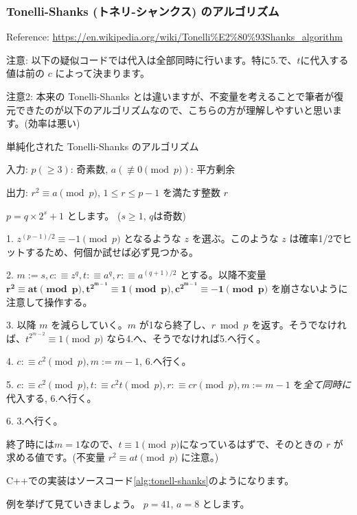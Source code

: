 \documentclass{jsarticle}
\begin{document}
   \subsubsection{Tonelli-Shanks (トネリ-シャンクス) のアルゴリズム}
Reference: \url{https://en.wikipedia.org/wiki/Tonelli%E2%80%93Shanks_algorithm}

注意: 以下の疑似コードでは代入は全部同時に行います。特に5.で、$t$に代入する値は前の $c$ によって決まります。

注意2: 本来の Tonelli-Shanks とは違いますが、不変量を考えることで筆者が復元できたのが以下のアルゴリズムなので、こちらの方が理解しやすいと思います。(効率は悪い)

\begin{algorithm}                      
\caption{単純化された Tonelli-Shanks のアルゴリズム}
\label{alg:simplified-tonelli-shanks}
入力: $p (\ge 3)$: 奇素数, $a (\not \equiv 0 \pmod p)$: 平方剰余

出力: $r^2 \equiv a \pmod p$, $1 \le r \le p - 1$ を満たす整数 $r$

$p = q \times 2^s + 1$ とします。 ($s \ge 1$, $q$は奇数)

1. $z^{(p-1)/2} \equiv -1 \pmod p$ となるような $z$ を選ぶ。このような $z$ は確率1/2でヒットするため、何個か試せば必ず見つかる。

2. $m := s, c:\equiv z^q, t :\equiv a^q, r :\equiv a^{(q + 1)/2}$ とする。以降不変量 $\bm{r^2\equiv at \pmod p, t^{2^{m - 1}} \equiv 1 \pmod p, c^{2^{m-1}} \equiv -1 \pmod p}$ を崩さないように注意して操作する。

3. 以降 $m$ を減らしていく。$m$ が1なら終了し、$r \bmod p$ を返す。そうでなければ、$t^{2^{m-2}} \equiv 1 \pmod p$ なら4.へ、そうでなければ5.へ行く。

4. $c :\equiv c^2 \pmod p, m := m - 1$, 6.へ行く。

5. $c :\equiv c^2 \pmod p, t :\equiv c^2 t \pmod p, r :\equiv cr \pmod p, m := m - 1$ を\emph{全て同時に}代入する, 6.へ行く。

6. 3.へ行く。

\end{algorithm}
終了時には$m=1$なので、$t\equiv 1 \pmod p$になっているはずで、そのときの $r$ が求める値です。(不変量 $r^2\equiv at \pmod p$ に注意。)



C++での実装はソースコード\ref{alg:tonell-shanks}のようになります。


例を挙げて見ていきましょう。
$p = 41$, $a = 8$ とします。
\end{document}
